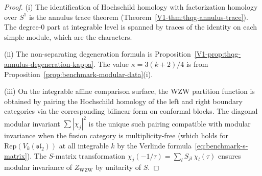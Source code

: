\begin{proof}
(i) The identification of Hochschild homology with factorization
homology over $S^1$ is the annulus trace theorem
(Theorem~\ref*{V1-thm:thqg-annulus-trace}). The degree-$0$ part
at integrable level is spanned by traces of the identity on
each simple module, which are the characters.

(ii) The non-separating degeneration formula is
Proposition~\ref*{V1-prop:thqg-annulus-degeneration-kappa}.
The value $\kappa = 3(k+2)/4$ is from
Proposition~\ref{prop:benchmark-modular-data}(i).

(iii) On the integrable affine comparison surface, the WZW
partition function is obtained by pairing the Hochschild
homology of the left and right boundary categories via the
corresponding bilinear form on conformal blocks. The diagonal
modular invariant $\sum |\chi_j|^2$ is the unique such pairing
compatible with modular invariance when the fusion category
is multiplicity-free (which holds for
$\mathrm{Rep}(V_k(\mathfrak{sl}_2))$ at all integrable $k$
by the Verlinde formula~\eqref{eq:benchmark-s-matrix}).
The $S$-matrix transformation $\chi_j(-1/\tau)
= \sum_l S_{jl}\, \chi_l(\tau)$ ensures modular invariance
of $Z_{\mathrm{WZW}}$ by unitarity of $S$.
\end{proof}

